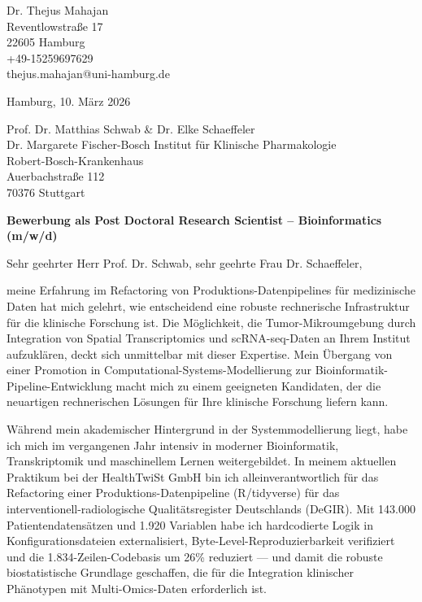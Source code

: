 \documentclass[9pt, a4paper]{extarticle}
\begin{document}
\pagestyle{empty}

\begin{flushleft}
Dr. Thejus Mahajan\\
Reventlowstra{\ss}e 17\\
22605 Hamburg\\
+49-15259697629\\
thejus.mahajan@uni-hamburg.de
\end{flushleft}

\vspace{0.3cm}

\begin{flushright}
Hamburg, 10. M\"arz 2026
\end{flushright}

\vspace{0.3cm}

\begin{flushleft}
Prof. Dr. Matthias Schwab \& Dr. Elke Schaeffeler\\
Dr. Margarete Fischer-Bosch Institut f\"ur Klinische Pharmakologie\\
Robert-Bosch-Krankenhaus\\
Auerbachstra{\ss}e 112\\
70376 Stuttgart
\end{flushleft}

\vspace{0.3cm}

\textbf{Bewerbung als Post Doctoral Research Scientist -- Bioinformatics (m/w/d)}

\vspace{0.2cm}

Sehr geehrter Herr Prof. Dr. Schwab, sehr geehrte Frau Dr. Schaeffeler,

meine Erfahrung im Refactoring von Produktions-Datenpipelines f\"ur medizinische Daten hat mich gelehrt, wie entscheidend eine robuste rechnerische Infrastruktur f\"ur die klinische Forschung ist. Die M\"oglichkeit, die Tumor-Mikroumgebung durch Integration von Spatial Transcriptomics und scRNA-seq-Daten an Ihrem Institut aufzukl\"aren, deckt sich unmittelbar mit dieser Expertise. Mein \"Ubergang von einer Promotion in Computational-Systems-Modellierung zur Bioinformatik-Pipeline-Entwicklung macht mich zu einem geeigneten Kandidaten, der die neuartigen rechnerischen L\"osungen f\"ur Ihre klinische Forschung liefern kann.

W\"ahrend mein akademischer Hintergrund in der Systemmodellierung liegt, habe ich mich im vergangenen Jahr intensiv in moderner Bioinformatik, Transkriptomik und maschinellem Lernen weitergebildet. In meinem aktuellen Praktikum bei der HealthTwiSt GmbH bin ich alleinverantwortlich f\"ur das Refactoring einer Produktions-Datenpipeline (R/tidyverse) f\"ur das interventionell-radiologische Qualit\"atsregister Deutschlands (DeGIR). Mit 143.000 Patientendatens\"atzen und 1.920 Variablen habe ich hardcodierte Logik in Konfigurationsdateien externalisiert, Byte-Level-Reproduzierbarkeit verifiziert und die 1.834-Zeilen-Codebasis um 26\% reduziert --- und damit die robuste biostatistische Grundlage geschaffen, die f\"ur die Integration klinischer Ph\"anotypen mit Multi-Omics-Daten erforderlich ist.
\end{document}
